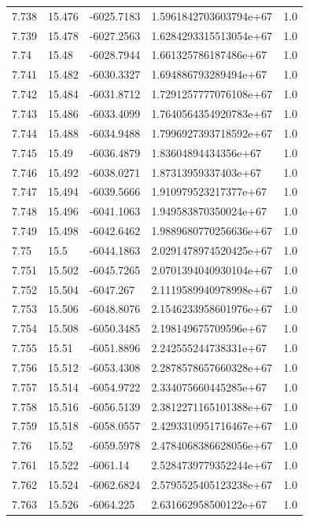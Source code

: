 \begin{tabular}{lllll}
7.738 & 15.476 & -6025.7183 & 1.5961842703603794e+67 & 1.0 \\
7.739 & 15.478 & -6027.2563 & 1.6284293315513054e+67 & 1.0 \\
7.74 & 15.48 & -6028.7944 & 1.661325786187486e+67 & 1.0 \\
7.741 & 15.482 & -6030.3327 & 1.694886793289494e+67 & 1.0 \\
7.742 & 15.484 & -6031.8712 & 1.7291257777076108e+67 & 1.0 \\
7.743 & 15.486 & -6033.4099 & 1.7640564354920783e+67 & 1.0 \\
7.744 & 15.488 & -6034.9488 & 1.7996927393718592e+67 & 1.0 \\
7.745 & 15.49 & -6036.4879 & 1.83604894434356e+67 & 1.0 \\
7.746 & 15.492 & -6038.0271 & 1.87313959337403e+67 & 1.0 \\
7.747 & 15.494 & -6039.5666 & 1.910979523217377e+67 & 1.0 \\
7.748 & 15.496 & -6041.1063 & 1.949583870350024e+67 & 1.0 \\
7.749 & 15.498 & -6042.6462 & 1.9889680770256636e+67 & 1.0 \\
7.75 & 15.5 & -6044.1863 & 2.0291478974520425e+67 & 1.0 \\
7.751 & 15.502 & -6045.7265 & 2.0701394040930104e+67 & 1.0 \\
7.752 & 15.504 & -6047.267 & 2.1119589940978998e+67 & 1.0 \\
7.753 & 15.506 & -6048.8076 & 2.1546233958601976e+67 & 1.0 \\
7.754 & 15.508 & -6050.3485 & 2.198149675709596e+67 & 1.0 \\
7.755 & 15.51 & -6051.8896 & 2.242555244738331e+67 & 1.0 \\
7.756 & 15.512 & -6053.4308 & 2.2878578657660328e+67 & 1.0 \\
7.757 & 15.514 & -6054.9722 & 2.334075660445285e+67 & 1.0 \\
7.758 & 15.516 & -6056.5139 & 2.3812271165101388e+67 & 1.0 \\
7.759 & 15.518 & -6058.0557 & 2.4293310951716467e+67 & 1.0 \\
7.76 & 15.52 & -6059.5978 & 2.4784068386628056e+67 & 1.0 \\
7.761 & 15.522 & -6061.14 & 2.5284739779352244e+67 & 1.0 \\
7.762 & 15.524 & -6062.6824 & 2.5795525405123238e+67 & 1.0 \\
7.763 & 15.526 & -6064.225 & 2.631662958500122e+67 & 1.0 \\

\end{tabular}
